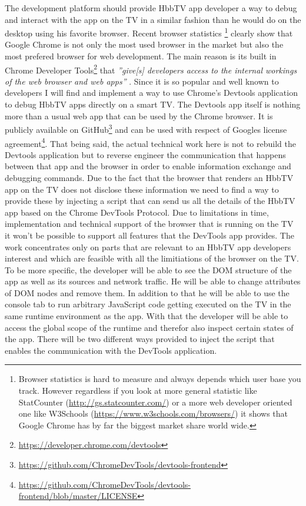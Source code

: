 The development platform should provide HbbTV app developer a way to debug and interact with the app on the
TV in a similar fashion than he would do on the desktop using his favorite browser. Recent browser statistics
\footnote{Browser statistics is hard to measure and always depends which user base you track. However regardless
if you look at more general statistic like StatCounter (\url{http://gs.statcounter.com/}) or a more web developer
oriented one like W3Schools (\url{https://www.w3schools.com/browsers/}) it shows that Google Chrome has by far
the biggest market share world wide.} clearly show that Google Chrome is not only the most used browser in the
market but also the most prefered browser for web development. The main reason is its built in Chrome Developer
Tools\footnote{\url{https://developer.chrome.com/devtools}} that \textit{''give[s] developers access to the internal
workings of the web browser and web apps''} \cite{devtools}. Since it is so popular and well known to developers
I will find and implement a way to use Chrome's Devtools application to debug HbbTV apps directly on a smart TV.
The Devtools app itself is nothing more than a usual web app that can be used by the Chrome browser. It is
publicly available on GitHub\footnote{\url{https://github.com/ChromeDevTools/devtools-frontend}} and can be used
with respect of Googles license agreement\footnote{\url{https://github.com/ChromeDevTools/devtools-frontend/blob/master/LICENSE}}.
That being said, the actual technical work here is not to rebuild the Devtools application but to reverse
engineer the communication that happens between that app and the browser in order to enable information exchange
and debugging commands. Due to the fact that the browser that renders an HbbTV app on the TV does not disclose
these information we need to find a way to provide these by injecting a script that can send us all the details
of the HbbTV app based on the Chrome DevTools Protocol. Due to limitations in time, implementation and
technical support of the browser that is running on the TV it won't be possible to support all features
that the DevTools app provides. The work concentrates only on parts that are relevant to an HbbTV app developers
interest and which are feasible with all the limitiations of the browser on the TV. To be more specific,
the developer will be able to see the DOM structure of the app as well as its sources and network traffic.
He will be able to change attributes of DOM nodes and remove them. In addition to that he will be able to
use the console tab to run arbitrary JavaScript code getting executed on the TV in the same runtime environment
as the app. With that the developer will be able to access the global scope of the runtime and therefor
also inspect certain states of the app. There will be two different ways provided to inject the script that
enables the communication with the DevTools application.

